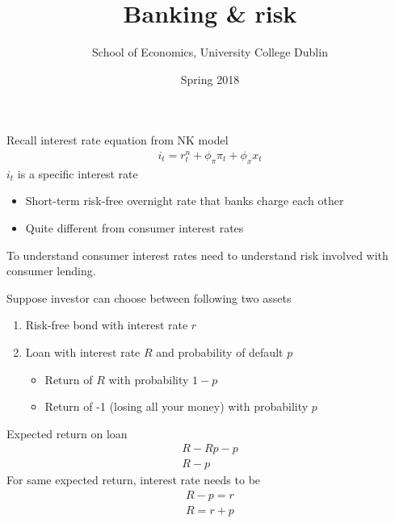 \documentclass{beamer}
\title{Banking \& risk}
\author{School of Economics, University College Dublin}
\date{Spring 2018}
\begin{document}
\begin{frame}
 \titlepage
\end{frame}

\begin{frame}
 Recall interest rate equation from NK model
  \begin{align} 
  i_t=r_t^n+ \phi_{\pi}\pi_t+\phi_xx_t 
\end{align}
\medskip
$i_t$ is a specific interest rate
\begin{itemize}
  \item Short-term risk-free overnight rate that banks charge each other
  \item Quite different from consumer interest rates
\end{itemize}
\medskip
To understand consumer interest rates need to understand risk involved with consumer lending. 
\end{frame}

\begin{frame}
 Suppose investor can choose between following two assets  
\begin{enumerate}
  \item Risk-free bond with interest rate $r$
  \item Loan with interest rate $R$ and probability of default $p$
  \begin{itemize}
    \item Return of $R$ with probability $1-p$
    \item Return of -1 (losing all your money) with probability $p$
  \end{itemize}
\end{enumerate}
\end{frame}

\begin{frame}
  Expected return on loan
  \begin{align}
    R-Rp-p\\ \nonumber
    R-p
\end{align}
 For same expected return, interest rate needs to be
\begin{align}
  R-p=r\\ \nonumber
  R=r+p
\end{align}
\end{frame}
\end{document}
